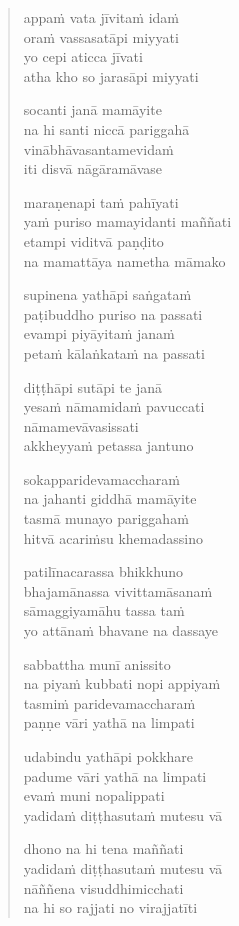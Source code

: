 

\cleartoverso

\vspace*{30mm}

\begin{verse}

appaṁ vata jīvitaṁ idaṁ\\
oraṁ vassasatāpi miyyati\\
yo cepi aticca jīvati\\
atha kho so jarasāpi miyyati

socanti janā mamāyite\\
na hi santi niccā pariggahā\\
vinābhāvasantamevidaṁ\\
iti disvā nāgāramāvase

maraṇenapi taṁ pahīyati\\
yaṁ puriso mamayidanti maññati\\
etampi viditvā paṇḍito\\
na mamattāya nametha māmako

supinena yathāpi saṅgataṁ\\
paṭibuddho puriso na passati\\
evampi piyāyitaṁ janaṁ\\
petaṁ kālaṅkataṁ na passati

diṭṭhāpi sutāpi te janā\\
yesaṁ nāmamidaṁ pavuccati\\
nāmamevāvasissati\\
akkheyyaṁ petassa jantuno

sokapparidevamaccharaṁ\\
na jahanti giddhā mamāyite\\
tasmā munayo pariggahaṁ\\
hitvā acariṁsu khemadassino

patilīnacarassa bhikkhuno\\
bhajamānassa vivittamāsanaṁ\\
sāmaggiyamāhu tassa taṁ\\
yo attānaṁ bhavane na dassaye

sabbattha munī anissito\\
na piyaṁ kubbati nopi appiyaṁ\\
tasmiṁ paridevamaccharaṁ\\
paṇṇe vāri yathā na limpati

udabindu yathāpi pokkhare\\
padume vāri yathā na limpati\\
evaṁ muni nopalippati\\
yadidaṁ diṭṭhasutaṁ mutesu vā

dhono na hi tena maññati\\
yadidaṁ diṭṭhasutaṁ mutesu vā\\
nāññena visuddhimicchati\\
na hi so rajjati no virajjatīti

\end{verse}

